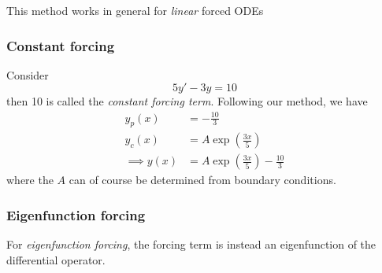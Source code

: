 \documentclass{../../template/note}
\begin{document}
    This method works in general for \emph{linear} forced ODEs

    \subsubsection{Constant forcing}

    \begin{example}
        Consider
        \[
            5y' - 3y = 10
        \]
        then 10 is called the \emph{constant forcing term}. Following our method, we have
        \begin{align*}
            y_p(x) &= -\frac{10}{3} \\
            y_c(x) &= A\exp\left(\frac{3x}{5}\right) \\
            \implies y(x) &= A\exp\left(\frac{3x}{5}\right) - \frac{10}{3}
        \end{align*}
        where the \(A\) can of course be determined from boundary conditions.        
    \end{example}
    
    \subsubsection{Eigenfunction forcing}

    For \emph{eigenfunction forcing}, the forcing term is instead an eigenfunction of the differential operator.
\end{document}
